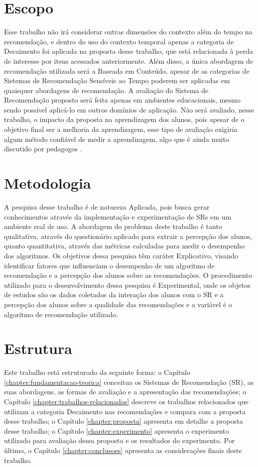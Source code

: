 \section{Escopo}

Esse trabalho não irá considerar outras dimensões do contexto além do tempo na recomendação, e dentro do uso do contexto
temporal apenas a categoria de Decaimento foi aplicada na proposta desse trabalho, que está relacionada à perda de
interesse por itens acessados anteriormente. Além disso, a única abordagem de recomendação utilizada será a Baseada em
Conteúdo, apesar de as categorias de Sistemas de Recomendação Sensíveis ao Tempo poderem ser aplicadas em quaisquer
abordagens de recomendação. A avaliação do Sistema de Recomendação proposto será feita apenas em ambientes educacionais,
mesmo sendo possível aplicá-lo em outros domínios de aplicação. Não será avaliado, nesse trabalho, o impacto da proposta
na aprendizagem dos alunos, pois apesar de o objetivo final ser a melhoria da aprendizagem, esse tipo de avaliação
exigiria algum método confiável de medir a aprendizagem, algo que é ainda muito discutido por pedagogos \cite{luckesi2014avaliaccao}.

\section{Metodologia}

A pesquisa desse trabalho é de natureza Aplicada, pois busca gerar conhecimentos através da implementação e experimentação
de SRs em um ambiente real de uso. A abordagem do problema deste trabalho é tanto qualitativa, através do questionário
aplicado para extrair a percepção dos alunos, quanto quantitativa, através das métricas calculadas para medir o desempenho
dos algoritmos. Os objetivos dessa pesquisa têm caráter Explicativo, visando identificar fatores que influenciam o
desempenho de um algoritmo de recomendação e a percepção dos alunos sobre as recomendações. O procedimento utilizado
para o desenvolvimento dessa pesquisa é Experimental, onde os objetos de estudos são os dados coletados da interação dos
alunos com o SR e a percepção dos alunos sobre a qualidade das recomendações e a variável é o algoritmo de recomendação
utilizado.

\section{Estrutura}

Este trabalho está estruturado da seguinte forma: o Capítulo \ref{chapter:fundamentacao-teorica} conceitua os Sistemas de
Recomendação (SR), as suas abordagens, as formas de avaliação e a apresentação das recomendações; o Capítulo \ref{chapter:trabalhos-relacionados}
descreve os trabalhos relacionados que utilizam a categoria Decaimento nas recomendações e compara com a proposta desse
trabalho; o Capítulo \ref{chapter:proposta} apresenta em detalhe a proposta desse trabalho; o Capítulo \ref{chapter:experimento}
apresenta o experimento utilizado para avaliação dessa proposta e os resultados do experimento. Por último, o Capítulo \ref{chapter:conclusoes} apresenta
as considerações finais deste trabalho.


